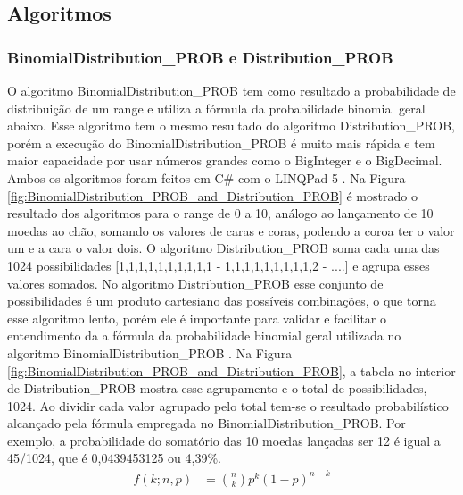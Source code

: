 \begin{apendicesenv}
\bigbreak\bigbreak
\chapter{Algoritmos}
\label{app:algoritmos}
\vspace{-8mm}
\subsection*{BinomialDistribution\_PROB e Distribution\_PROB}
O algoritmo BinomialDistribution\_PROB tem como resultado a probabilidade de distribuição de um range e utiliza a fórmula  da probabilidade binomial geral abaixo. Esse algoritmo tem o mesmo resultado do algoritmo Distribution\_PROB, porém a execução do BinomialDistribution\_PROB é muito mais rápida e tem maior capacidade por usar números grandes como o BigInteger e o BigDecimal. Ambos os algoritmos foram feitos em C\# com o LINQPad 5 \footnotemark. Na Figura \ref{fig:BinomialDistribution_PROB_and_Distribution_PROB} é mostrado o resultado dos algoritmos para o range de 0 a 10, análogo ao lançamento de 10 moedas ao chão, somando os valores de caras e coras, podendo a coroa ter o valor um e a cara o valor dois. O algoritmo Distribution\_PROB soma cada uma das 1024 possibilidades [1,1,1,1,1,1,1,1,1,1 - 1,1,1,1,1,1,1,1,1,2 - ....] e agrupa esses valores somados. No algoritmo Distribution\_PROB esse conjunto de possibilidades é um produto cartesiano das possíveis combinações, o que torna esse algoritmo lento, porém ele é importante para validar e facilitar o entendimento da a fórmula da probabilidade binomial geral utilizada no algoritmo BinomialDistribution\_PROB \cite{mathisfun_binomial_distribution}. Na Figura \ref{fig:BinomialDistribution_PROB_and_Distribution_PROB}, a tabela no interior de  Distribution\_PROB mostra esse agrupamento e o total de possibilidades, 1024. Ao dividir cada valor agrupado pelo total tem-se o resultado probabilístico alcançado pela fórmula empregada no BinomialDistribution\_PROB. Por exemplo, a probabilidade do somatório das 10 moedas lançadas ser 12 é igual a 45/1024, que é 0,0439453125 ou 4,39\%.
\begin{align*}
f(k;n,p) &= \binom{n}{k} p^k(1 - p)^{n-k}
\end{align*}

\end{apendicesenv}
